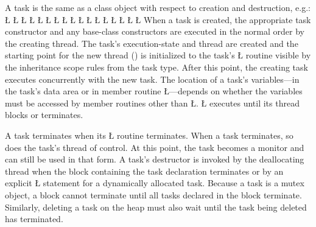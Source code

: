 \documentclass[openright,twoside]{report}
\begin{document}
A task is the same as a class object with respect to creation and destruction, e.g.:
\LGinlinefalse\LGbegin\lgrinde
\L{}
\L{\LB{}}
\CE{}\L{}
\L{\LB{}}
\L{\LB{\};}}
\L{}
\CE{}\L{}
\CE{}\L{\LB{}}
\CE{}\L{\LB{}}
\CE{}\L{\LB{}}
\L{\LB{}}
\CE{}\L{\LB{}}
\CE{}\L{\LB{}}
\CE{}\L{\LB{}}
\L{}
\CE{}\L{}
\L{}
\CE{}\endlgrinde\LGend
When a task is created, the appropriate task constructor and any base-class constructors are executed in the normal order by the creating thread.
The task's execution-state and thread are created and the starting point for the new thread () is initialized to the task's \LGinlinetrue\LGbegin\lgrinde\L{}\endlgrinde\LGend{} routine visible by the inheritance scope rules from the task type.
After this point, the creating task executes concurrently with the new task.
The location of a task's variables---in the task's data area or in member routine \LGinlinetrue\LGbegin\lgrinde\L{}\endlgrinde\LGend{}---depends on whether the variables must be accessed by member routines other than \LGinlinetrue\LGbegin\lgrinde\L{}\endlgrinde\LGend{}.
\LGinlinetrue\LGbegin\lgrinde\L{}\endlgrinde\LGend{} executes until its thread blocks or terminates.

A task terminates when its \LGinlinetrue\LGbegin\lgrinde\L{}\endlgrinde\LGend{} routine terminates.
When a task terminates, so does the task's thread of control.
At this point, the task becomes a monitor and can still be used in that form.
A task's destructor is invoked by the deallocating thread when the block containing the task declaration terminates or by an explicit \LGinlinetrue\LGbegin\lgrinde\L{}\endlgrinde\LGend{} statement for a dynamically allocated task.
Because a task is a mutex object, a block cannot terminate until all tasks declared in the block terminate.
Similarly, deleting a task on the heap must also wait until the task being deleted has terminated.
\end{document}
